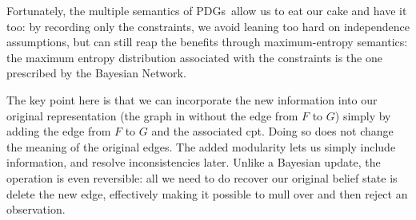 \documentclass{article}
\newcommand{\MN}{PDG}
\newcommand{\MNs}{\MN s}
\numberwithin{equation}{section}
\begin{document}
\begin{example}
\begin{vfull}
{			Fortunately, the multiple semantics of \MNs\ allow us to eat our cake and have it too: by recording only the constraints, we avoid leaning too hard on independence assumptions, but can still reap the benefits through maximum-entropy semantics: the maximum entropy distribution associated with the constraints is the one prescribed by the Bayesian Network.
		}
		\end{vfull}
	
		The key point here is that we can incorporate the new information into
		our original representation (the graph in 
		without the edge from $F$ to $G$) simply  by adding the edge from $F$
		to $G$ and the associated cpt.  Doing so does not change the meaning
		of the original edges.  The added modularity lets us simply include
		information, and resolve inconsistencies later. Unlike a Bayesian
		update, the operation is even reversible: all we need to do recover
		our original belief state is delete the new edge, effectively making
		it possible to mull over and then reject an observation.
	\end{example}
\end{document}
